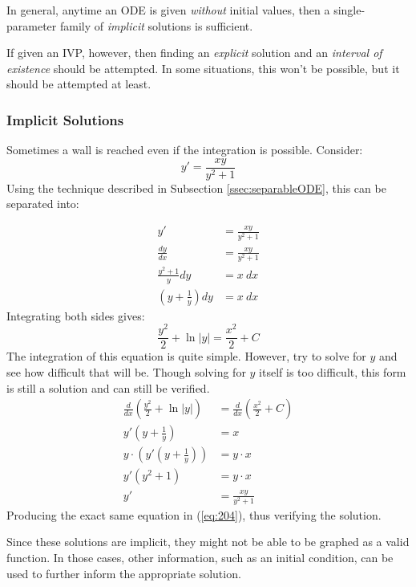 \documentclass[12pt]{article}
\begin{document}
In general, anytime an ODE is given \textit{without} initial values, then a single-parameter family of \textit{implicit} solutions is sufficient.

If given an IVP, however, then finding an \textit{explicit} solution and an \textit{interval of existence} should be attempted. In some situations, this won't be possible, but it should be attempted at least.

\subsubsection{Implicit Solutions}
\label{sssec:implicitSolution}

Sometimes a wall is reached even if the integration is possible. Consider:
\begin{equation}
  y' = \frac{xy}{y^2 + 1}
  \label{eq:204}
\end{equation}
Using the technique described in Subsection \ref{ssec:separableODE}, this can be separated into:

\begin{align*}
  y' &= \frac{xy}{y^2 + 1} \\
  \frac{dy}{dx} &= \frac{xy}{y^2 + 1} \\
  \frac{y^2 + 1}{y}dy  &= x\ dx \\
  \left(y+\frac{1}{y}\right)dy  &= x\ dx
\end{align*}
Integrating both sides gives:
\begin{equation*}
  \frac{y^2}{2} + \ln|y| = \frac{x^2}{2} + C
\end{equation*}
The integration of this equation is quite simple. However, try to solve for $y$ and see how difficult that will be. Though solving for $y$ itself is too difficult, this form is still a solution and can still be verified.
\begin{align*}
  \frac{d}{dx}\left(\frac{y^2}{2} + \ln|y|\right) &= \frac{d}{dx}\left(\frac{x^2}{2} + C\right) \\
  y'\left(y + \frac{1}{y}\right) &= x \\
  y \cdot \left(y'\left(y + \frac{1}{y}\right) \right) &= y \cdot x \\
  y'\left(y^2 + 1\right) &= y \cdot x \\
  y' &= \frac{xy}{y^2 + 1}
\end{align*}
Producing the exact same equation in (\ref{eq:204}), thus verifying the solution.

Since these solutions are implicit, they might not be able to be graphed as a valid function. In those cases, other information, such as an initial condition, can be used to further inform the appropriate solution.
\end{document}
